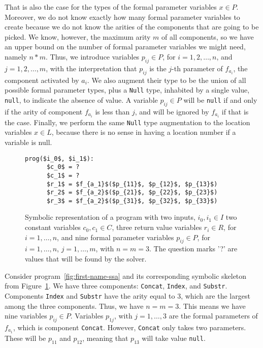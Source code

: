 That is also the case for the types of the formal parameter variables $x \in P$.
Moreover, we do not know exactly how many formal parameter variables to create
because we do not know the arities of the components that are going to be picked.
We know, however, the maximum arity $m$ of all components, so we have an upper
bound on the number of formal parameter variables we might need, namely
$n * m$.
Thus, we introduce variables $p_{ij} \in P$, for $i = 1, 2, \ldots, n$, and
$j = 1, 2, \ldots, m$, with the interpretation that $p_{ij}$ is the $j$-th
parameter of $f_{a_i}$, the component activated by $a_i$.
We also augment their type to be the union of all possible formal parameter
types, plus a \lstinline{Null} type, inhabited by a single value,
\lstinline{null}, to indicate the absence of value.
A variable $p_{ij} \in P$ will be \lstinline{null} if and only if the arity of
component $f_{a_i}$ is less than $j$, and will be ignored by $f_{a_i}$ if that
is the case.
Finally, we perform the same \lstinline{Null} type augmentation to the location
variables $x \in L$, because there is no sense in having a location number if a
variable is null.

\begin{figure}
  \begin{lstlisting}[frame=tlrb,mathescape=true]
    prog($i_0$, $i_1$):
      $c_0$ = ?
      $c_1$ = ?
      $r_1$ = $f_{a_1}$($p_{11}$, $p_{12}$, $p_{13}$)
      $r_2$ = $f_{a_2}$($p_{21}$, $p_{22}$, $p_{23}$)
      $r_3$ = $f_{a_2}$($p_{31}$, $p_{32}$, $p_{33}$)
  \end{lstlisting}
\caption{Symbolic representation of a program with two inputs, $i_0, i_1 \in I$
  two constant variables $c_0, c_1 \in C$, three return value variables $r_i \in
  R$, for $i = 1, \ldots, n$, and nine formal parameter variables $p_{ij} \in
  P$, for $i = 1, \ldots, n$, $j = 1, \ldots, m$, with $n = m = 3$.
  The question marks '?' are values that will be found by the solver.}
\label{fig:whole-encoding-prog}
\end{figure}

\begin{example}
  Consider program~\ref{fig:first-name-ssa} and its corresponding symbolic
  skeleton from Figure~\ref{fig:whole-encoding-prog}.
  We have three components: \lstinline{Concat}, \lstinline{Index}, and
  \lstinline{Substr}.
  Components \lstinline{Index} and \lstinline{Substr} have the arity equal to 3,
  which are the largest among the three components.
  Thus, we have $n = m = 3$. This means we have nine variables $p_{ij} \in P$.
  Variables $p_{1j}$, with $j = 1, \ldots, 3$ are the formal parameters of
  $f_{a_1}$, which is component \lstinline{Concat}.
  However, \lstinline{Concat} only takes two parameters.
  These will be $p_{11}$ and $p_{12}$, meaning that $p_{13}$ will take value
  \lstinline{null}.
\end{example}

